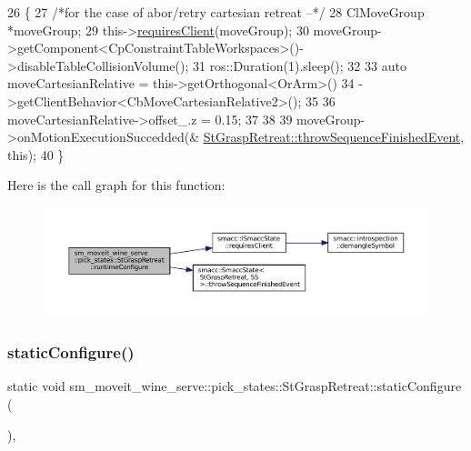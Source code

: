 \begin{DoxyCode}
26     \{
27         \textcolor{comment}{/*for the case of abor/retry cartesian retreat --*/}
28         ClMoveGroup *moveGroup;
29         this->\hyperlink{classsmacc_1_1ISmaccState_a7f95c9f0a6ea2d6f18d1aec0519de4ac}{requiresClient}(moveGroup);
30         moveGroup->getComponent<CpConstraintTableWorkspaces>()->disableTableCollisionVolume();
31         ros::Duration(1).sleep();
32 
33         \textcolor{keyword}{auto} moveCartesianRelative = this->getOrthogonal<OrArm>()
34                                          ->getClientBehavior<CbMoveCartesianRelative2>();
35 
36         moveCartesianRelative->offset\_.z = 0.15;
37 
38 
39         moveGroup->onMotionExecutionSuccedded(&
      \hyperlink{classsmacc_1_1SmaccState_a49dcfc25824f7e083dd4b999c49ab2b6}{StGraspRetreat::throwSequenceFinishedEvent}, \textcolor{keyword}{this});
40     \}
\end{DoxyCode}
Here is the call graph for this function\+:
\nopagebreak
\begin{figure}[H]
\begin{center}
\leavevmode
\includegraphics[width=350pt]{structsm__moveit__wine__serve_1_1pick__states_1_1StGraspRetreat_a5c46ccb270eeff460cc652656f748c23_cgraph}
\end{center}
\end{figure}
\mbox{\label{structsm__moveit__wine__serve_1_1pick__states_1_1StGraspRetreat_a9641c0850e0086eab00bbc1e1227cb8f}} 
\subsubsection{\texorpdfstring{static\+Configure()}{staticConfigure()}}
{\footnotesize\ttfamily static void sm\+\_\+moveit\+\_\+wine\+\_\+serve\+::pick\+\_\+states\+::\+St\+Grasp\+Retreat\+::static\+Configure (\begin{DoxyParamCaption}{ }\end{DoxyParamCaption})\hspace{0.3cm}{\ttfamily [inline]}, {\ttfamily [static]}}



